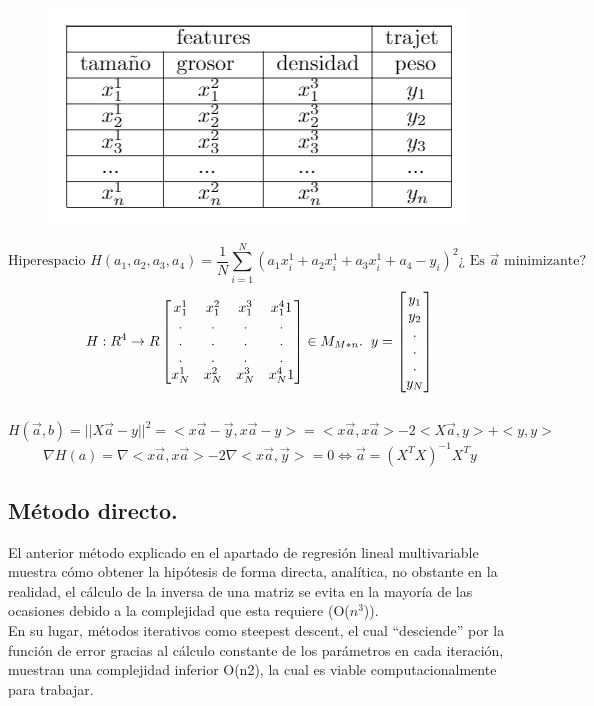 \documentclass[a4paper,10pt]{article}
\begin{document}
\begin{figure}[H]
\centering
\includegraphics[scale=0.8]{Annotation 2020-03-23 133547}
\end{figure}
 \[\text{Hiperespacio } H(a_{1},a_{2},a_{3},a_{4})=\frac{1}{N}\sum_{i=1}^{N}(a_{1}x_i^1+a_{2}x_i^1+a_{3}x_i^1+a_{4}-y_{i})^2 \text{¿ Es } \vec{a}\text{ minimizante?}
\]
\[H:R^4\rightarrow R \begin{bmatrix}
    x_{1}^1 & x_{1}^2 & x_{1}^3 & x_{1}^4 1 \\
    .&.&.&.\\
    .&.&.&.\\
    .&.&.&.\\
    x_{N}^1 & x_{N}^2 & x_{N}^3 & x_{N}^4 1
\end{bmatrix} \in M_{M*n}. \hspace{0.20cm} y=\begin{bmatrix}y_{1}\\y_{2}\\.\\.\\.\\y_{N}\end{bmatrix}\] \\ \[H(\vec{a},b)=||X\vec{a}-y||^2 = <x\vec{a}-\vec{y},x\vec{a}-y>=<x\vec{a},x\vec{a}>-2<X\vec{a},y>+<y,y>\]
\[\nabla H(a)=\nabla<x\vec{a},x\vec{a}>-2\nabla<x\vec{a},\vec{y}>=0\Leftrightarrow \boxed{ \vec{a}=(X^T X)^{-1} X^T y}\]

\subsection{Método directo.}

El anterior método explicado en el apartado de regresión lineal multivariable muestra cómo obtener la hipótesis de forma directa, analítica, no obstante en la realidad, el cálculo de la inversa de una matriz se evita en la mayoría de las ocasiones debido a la complejidad que esta requiere (O($n^3$)).\\
En su lugar, métodos iterativos como steepest descent, el cual “desciende” por la función de error gracias al cálculo constante de los parámetros en cada iteración, muestran una complejidad inferior O(n2), la cual es viable computacionalmente para trabajar. 
\end{document}
